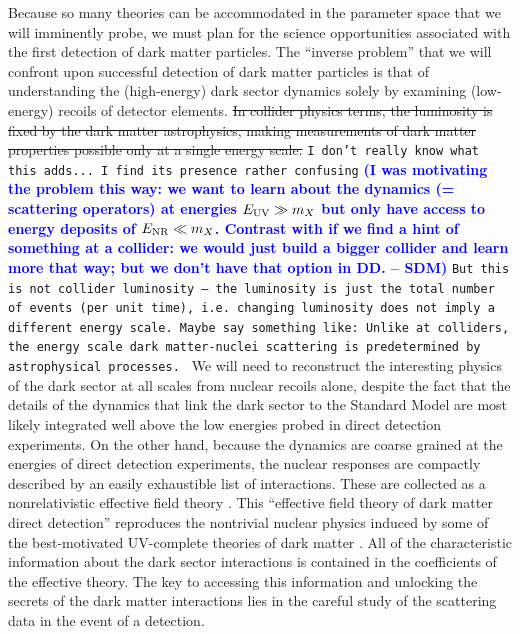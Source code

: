 \documentclass[11pt]{article}
\newcommand{\sdm}[1]{\textcolor{blue}{\textbf{(#1 -- SDM)}}}
\newcommand{\sjwColor}{red}
\newcommand{\sjwrm}[1]{{\color{\sjwColor}\protect\sout{#1}}}
\newcommand{\sjwtt}[1]{{\color{\sjwColor}\tt #1}}
\begin{document}
Because so many theories can be accommodated in the parameter space that we will imminently probe, we must plan for the science opportunities associated with the first detection of dark matter particles. The ``inverse problem'' that we will confront upon successful detection of dark matter particles is that of understanding the (high-energy) dark sector dynamics solely by examining (low-energy) recoils of detector elements. \sjwrm{In collider physics terms, the luminosity is fixed by the dark matter astrophysics, making measurements of dark matter properties possible only at a single energy scale.} \sjwtt{I don't really know what this adds... I find its presence rather confusing} \sdm{I was motivating the problem this way: we want to learn about the dynamics (= scattering operators) at energies $E_{\rm UV} \gg m_X$ but only have access to energy deposits of $E_{\rm NR} \ll m_X$. Contrast with if we find a hint of something at a collider: we would just build a bigger collider and learn more that way; but we don't have that option in DD.} \sjwtt{But this is not collider luminosity -- the luminosity is just the total number of events (per unit time), i.e. changing luminosity does not imply a different energy scale. Maybe say something like: Unlike at colliders, the energy scale dark matter-nuclei scattering is predetermined by astrophysical processes. } We will need to reconstruct the interesting physics of the dark sector at all scales from nuclear recoils alone, despite the fact that the details of the dynamics that link the dark sector to the Standard Model are most likely integrated well above the low energies probed in direct detection experiments. On the other hand, because the dynamics are coarse grained at the energies of direct detection experiments, the nuclear responses are compactly described by an easily exhaustible list of interactions. These are collected as a nonrelativistic effective field theory \cite{Fitzpatrick:2012ix, Anand:2013yka}. This ``effective field theory of dark matter direct detection'' reproduces the nontrivial nuclear physics induced by some of the best-motivated UV-complete theories of dark matter \cite{Gresham:2014vja, Gluscevic:2015sqa}. %
All of the characteristic information about the dark sector interactions is contained in the coefficients of the effective theory. The key to accessing this information and unlocking the secrets of the dark matter interactions lies in the careful study of the scattering data in the event of a detection.
\end{document}
